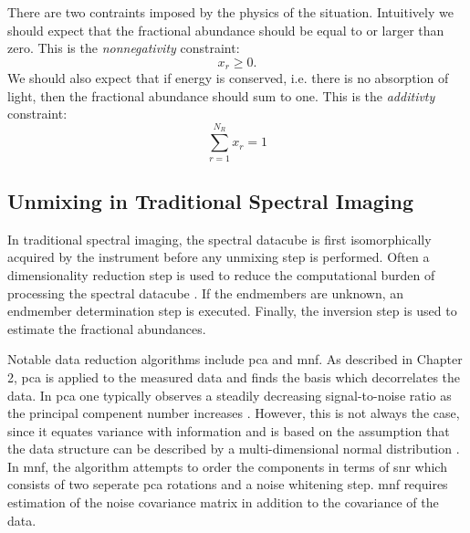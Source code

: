 There are two contraints imposed by the physics of the situation. Intuitively we should expect that the fractional abundance should be equal to or larger than zero. This is the \emph{nonnegativity} constraint:
%
\begin{equation}
	x_r \geq 0.
\end{equation}
%
We should also expect that if energy is conserved, i.e. there is no absorption of light, then the \gls{fractional abundance} should sum to one. This is the \emph{additivty} constraint:
%
\begin{equation}
	\sum_{r = 1}^{N_{R}} x_r = 1
\end{equation}


\subsection{Unmixing in Traditional Spectral Imaging}

In traditional spectral imaging, the spectral datacube is first isomorphically acquired by the instrument before any unmixing step is performed. Often a \gls{dimensionality reduction} step is used to reduce the computational burden of processing the spectral datacube \cite{keshava2002spectral, keshava2003survey}. If the endmembers are unknown, an \gls{endmember determination} step is executed. Finally, the \gls{inversion} step is used to estimate the fractional abundances. 

Notable data reduction algorithms include \acrfull{pca} and \acrfull{mnf}. As described in Chapter 2, \gls{pca} is applied to the measured data and finds the basis which decorrelates the data. In \gls{pca} one typically observes a steadily decreasing signal-to-noise ratio as the principal compenent number increases \cite{green1988transformation}. However, this is not always the case, since it equates variance with information and is based on the assumption that the data structure can be described by a multi-dimensional normal distribution \cite{philpot2015mnf}. In \gls{mnf}, the algorithm attempts to order the components in terms of \gls{snr} which consists of two seperate \gls{pca} rotations and a noise whitening step. \gls{mnf} requires estimation of the noise covariance matrix in addition to the covariance of the data.


